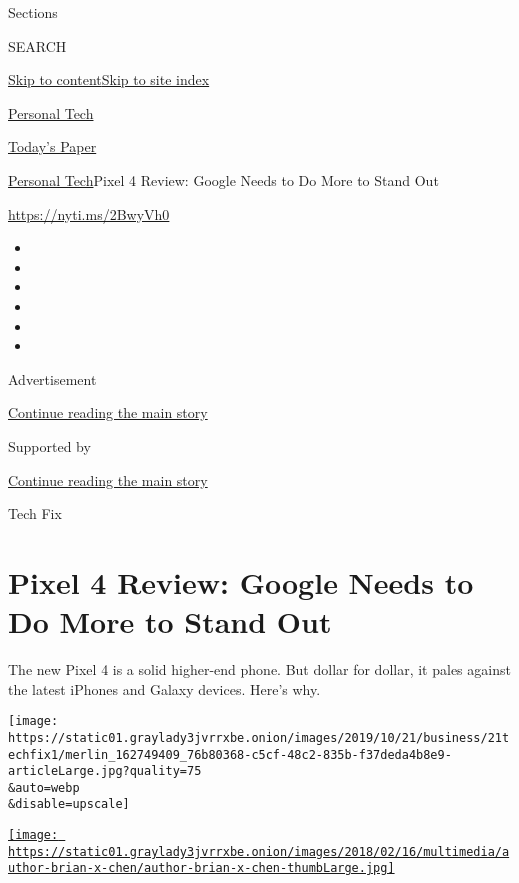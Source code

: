 Sections

SEARCH

\protect\hyperlink{site-content}{Skip to
content}\protect\hyperlink{site-index}{Skip to site index}

\href{https://www.nytimes3xbfgragh.onion/section/technology/personaltech}{Personal
Tech}

\href{https://myaccount.nytimes3xbfgragh.onion/auth/login?response_type=cookie\&client_id=vi}{}

\href{https://www.nytimes3xbfgragh.onion/section/todayspaper}{Today's
Paper}

\href{/section/technology/personaltech}{Personal Tech}\textbar{}Pixel 4
Review: Google Needs to Do More to Stand Out

\href{https://nyti.ms/2BwyVh0}{https://nyti.ms/2BwyVh0}

\begin{itemize}
\item
\item
\item
\item
\item
\item
\end{itemize}

Advertisement

\protect\hyperlink{after-top}{Continue reading the main story}

Supported by

\protect\hyperlink{after-sponsor}{Continue reading the main story}

Tech Fix

\hypertarget{pixel-4-review-google-needs-to-do-more-to-stand-out}{%
\section{Pixel 4 Review: Google Needs to Do More to Stand
Out}\label{pixel-4-review-google-needs-to-do-more-to-stand-out}}

The new Pixel 4 is a solid higher-end phone. But dollar for dollar, it
pales against the latest iPhones and Galaxy devices. Here's why.

\texttt{[image: https://static01.graylady3jvrrxbe.onion/images/2019/10/21/business/21techfix1/merlin\_162749409\_76b80368-c5cf-48c2-835b-f37deda4b8e9-articleLarge.jpg?quality=75\\\&auto=webp\\\&disable=upscale]}

\href{https://www.nytimes3xbfgragh.onion/by/brian-x-chen}{\texttt{[image: https://static01.graylady3jvrrxbe.onion/images/2018/02/16/multimedia/author-brian-x-chen/author-brian-x-chen-thumbLarge.jpg]}}

